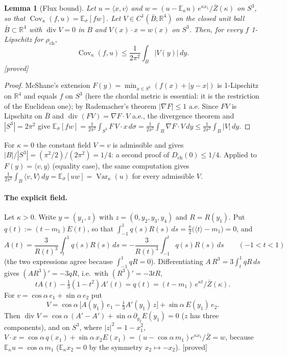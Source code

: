 \documentclass[11pt,a4paper]{article}
\newtheorem{lemma}[theorem]{Lemma}
\theoremstyle{remark}
\theoremstyle{definition}
\theoremstyle{plain}
\theoremstyle{remark}
\newcommand{\R}{\mathbb{R}}
\newcommand{\E}{\mathbb{E}}
\newcommand{\Cov}{\operatorname{Cov}}
\newcommand{\Var}{\operatorname{Var}}
\newcommand{\st}[1]{\textsf{[#1]}}
\newcommand{\Zb}{\bar Z}
\newcommand{\Dch}{D_{\mathrm{ch}}}
\newcommand{\rch}{\rho_{\mathrm{ch}}}
\begin{document}
\begin{lemma}[Flux bound]\label{lem:flux}
Let $u=\langle x,v\rangle$ and $w=(u-\E_\kappa u)\,e^{\kappa x_1}/\Zb(\kappa)$ on $S^3$, so that
$\Cov_\kappa(f,u)=\E_{\bar\sigma}[fw]$. Let $V\in C^1(\bar B;\R^4)$ on the closed unit ball $\bar B\subset\R^4$ with
$\operatorname{div}V=0$ in $B$ and $V(x)\cdot x=w(x)$ on $S^3$. Then, for every $f$ 1-Lipschitz for $\rch$,
\[
\Cov_\kappa(f,u)\le\frac1{2\pi^2}\int_B|V(y)|\,dy .
\]
\st{proved}
\end{lemma}
\begin{proof}
McShane's extension $F(y)=\min_{x\in S^3}(f(x)+|y-x|)$ is 1-Lipschitz on $\R^4$ and equals $f$ on $S^3$ (here the
chordal metric is essential: it is the restriction of the Euclidean one); by Rademacher's theorem
$|\nabla F|\le1$ a.e. Since $FV$ is Lipschitz on $\bar B$ and $\operatorname{div}(FV)=\nabla F\cdot V$ a.e., the
divergence theorem and $|S^3|=2\pi^2$ give
$\E_{\bar\sigma}[fw]=\frac1{2\pi^2}\int_{S^3}F\,V\cdot x\,d\sigma=\frac1{2\pi^2}\int_B\nabla F\cdot V\,dy
\le\frac1{2\pi^2}\int_B|V|\,dy$.
\end{proof}
For $\kappa=0$ the constant field $V=v$ is admissible and gives $|B|/|S^3|=(\pi^2/2)/(2\pi^2)=1/4$: a second proof of
$\Dch(0)\le1/4$. Applied to $F(y)=\langle v,y\rangle$ (equality case), the same computation gives
$\frac1{2\pi^2}\int_B\langle v,V\rangle\,dy=\E_{\bar\sigma}[uw]=\Var_\kappa(u)$ for every admissible $V$.

\paragraph{The explicit field.} Let $\kappa>0$. Write $y=(y_1,z)$ with $z=(0,y_2,y_3,y_4)$ and $R=R(y_1)$. Put
$q(t):=(t-m_1)E(t)$, so that $\int_{-1}^1q(s)R(s)\,ds=\frac\pi2\big(\langle t\rangle-m_1\big)=0$, and
\begin{equation}\label{eq:ode}
A(t)=\frac{3}{R(t)^3}\int_t^1q(s)R(s)\,ds=-\frac{3}{R(t)^3}\int_{-1}^tq(s)R(s)\,ds\qquad(-1<t<1)
\end{equation}
(the two expressions agree because $\int_{-1}^1qR=0$). Differentiating $A\,R^3=3\int_t^1qR\,ds$ gives $(AR^3)'=-3qR$, i.e.\ with $(R^3)'=-3tR$,
\begin{equation}\label{eq:odeA}
tA(t)-\tfrac13(1-t^2)A'(t)=q(t)=(t-m_1)\,e^{\kappa t}/\Zb(\kappa).
\end{equation}
For $v=\cos\alpha\,e_1+\sin\alpha\,e_2$ put
\begin{equation}\label{eq:field}
V=\cos\alpha\,\big[A(y_1)\,e_1-\tfrac13A'(y_1)\,z\big]+\sin\alpha\,E(y_1)\,e_2 .
\end{equation}
Then $\operatorname{div}V=\cos\alpha\,(A'-A')+\sin\alpha\,\partial_{y_2}E(y_1)=0$ ($z$ has three components), and on
$S^3$, where $|z|^2=1-x_1^2$, $V\cdot x=\cos\alpha\,q(x_1)+\sin\alpha\,x_2E(x_1)=(u-\cos\alpha\,m_1)e^{\kappa x_1}/\Zb=w$,
because $\E_\kappa u=\cos\alpha\,m_1$ ($\E_\kappa x_2=0$ by the symmetry $x_2\mapsto-x_2$). \st{proved}
\end{document}
